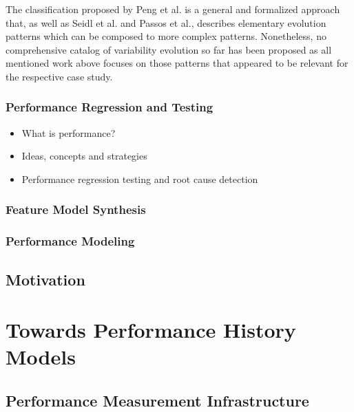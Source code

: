\documentclass[bibliography=totoc]{tubsreprt}
\begin{document}
The classification proposed by Peng et al. is a general and formalized approach
that, as well as Seidl et al. and Passos et al., describes elementary evolution
patterns which can be composed to more complex patterns. Nonetheless, no
comprehensive catalog of variability evolution so far has been proposed as all
mentioned work above focuses on those patterns that appeared to be relevant for
the respective case study.


\subsection{Performance Regression and Testing}
\begin{itemize}
  \item What is performance? \cite{molyneaux_art_2014}
  \item Ideas, concepts and strategies
  \cite{molyneaux_art_2014,fleming_how_1986,woodside_future_2007}
  \item Performance regression testing
  \cite{nguyen_industrial_2014,foo_mining_2010} and root cause detection
  \cite{heger_automated_2013}
\end{itemize}
\subsection{Feature Model Synthesis}
\subsection{Performance Modeling}

\section{Motivation}

\chapter{Towards Performance History Models}

\section{Performance Measurement Infrastructure}
\end{document}
